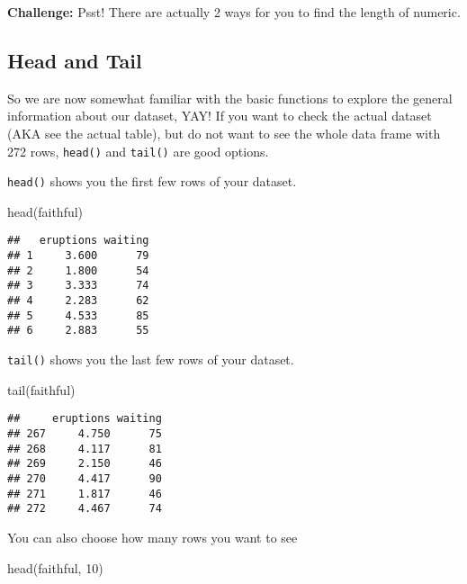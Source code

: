 \documentclass[
]{book}
\newenvironment{Shaded}{\begin{snugshade}}{\end{snugshade}}
\newcommand{\DecValTok}[1]{\textcolor[rgb]{0.00,0.00,0.81}{#1}}
\newcommand{\FunctionTok}[1]{\textcolor[rgb]{0.00,0.00,0.00}{#1}}
\newcommand{\NormalTok}[1]{#1}
\begin{document}
\textbf{Challenge:} Psst! There are actually 2 ways for you to find the length of numeric.

\hypertarget{head-and-tail}{%
\subsection{Head and Tail}\label{head-and-tail}}

So we are now somewhat familiar with the basic functions to explore the general information about our dataset, YAY! If you want to check the actual dataset (AKA see the actual table), but do not want to see the whole data frame with 272 rows, \texttt{head()} and \texttt{tail()} are good options.

\texttt{head()} shows you the first few rows of your dataset.

\begin{Shaded}
\begin{Highlighting}[]
\FunctionTok{head}\NormalTok{(faithful)}
\end{Highlighting}
\end{Shaded}

\begin{verbatim}
##   eruptions waiting
## 1     3.600      79
## 2     1.800      54
## 3     3.333      74
## 4     2.283      62
## 5     4.533      85
## 6     2.883      55
\end{verbatim}

\texttt{tail()} shows you the last few rows of your dataset.

\begin{Shaded}
\begin{Highlighting}[]
\FunctionTok{tail}\NormalTok{(faithful)}
\end{Highlighting}
\end{Shaded}

\begin{verbatim}
##     eruptions waiting
## 267     4.750      75
## 268     4.117      81
## 269     2.150      46
## 270     4.417      90
## 271     1.817      46
## 272     4.467      74
\end{verbatim}

You can also choose how many rows you want to see

\begin{Shaded}
\begin{Highlighting}[]
\FunctionTok{head}\NormalTok{(faithful, }\DecValTok{10}\NormalTok{)}
\end{Highlighting}
\end{Shaded}
\end{document}
